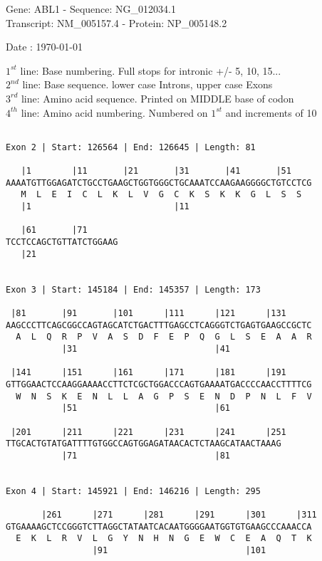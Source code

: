 \documentclass{article}
\begin{document}
\begin{center}
\begin{large}
Gene: ABL1 - Sequence: NG\_012034.1\\
Transcript: NM\_005157.4 - Protein: NP\_005148.2
 
 Date : \today
\end{large}
\end{center}
$1^{st}$ line: Base numbering. Full stops for intronic +/- 5, 10, 15...\\
$2^{nd}$ line: Base sequence. lower case Introns, upper case Exons\\
$3^{rd}$ line: Amino acid sequence. Printed on MIDDLE base of codon\\
$4^{th}$ line: Amino acid numbering. Numbered on $1^{st}$ and increments of 10\\
 \begin{Verbatim}
 
Exon 2 | Start: 126564 | End: 126645 | Length: 81
 
   |1        |11       |21       |31       |41       |51    
AAAATGTTGGAGATCTGCCTGAAGCTGGTGGGCTGCAAATCCAAGAAGGGGCTGTCCTCG
   M  L  E  I  C  L  K  L  V  G  C  K  S  K  K  G  L  S  S  
   |1                            |11                        
  
   |61       |71      
TCCTCCAGCTGTTATCTGGAAG
   |21                
  
 
Exon 3 | Start: 145184 | End: 145357 | Length: 173
 
 |81       |91       |101      |111      |121      |131     
AAGCCCTTCAGCGGCCAGTAGCATCTGACTTTGAGCCTCAGGGTCTGAGTGAAGCCGCTC
  A  L  Q  R  P  V  A  S  D  F  E  P  Q  G  L  S  E  A  A  R
           |31                           |41                
  
 |141      |151      |161      |171      |181      |191     
GTTGGAACTCCAAGGAAAACCTTCTCGCTGGACCCAGTGAAAATGACCCCAACCTTTTCG
  W  N  S  K  E  N  L  L  A  G  P  S  E  N  D  P  N  L  F  V
           |51                           |61                
  
 |201      |211      |221      |231      |241      |251
TTGCACTGTATGATTTTGTGGCCAGTGGAGATAACACTCTAAGCATAACTAAAG
           |71                           |81          
  
 
Exon 4 | Start: 145921 | End: 146216 | Length: 295
 
       |261      |271      |281      |291      |301      |311
GTGAAAAGCTCCGGGTCTTAGGCTATAATCACAATGGGGAATGGTGTGAAGCCCAAACCA
  E  K  L  R  V  L  G  Y  N  H  N  G  E  W  C  E  A  Q  T  K
                 |91                           |101         
  

\end{Verbatim}
\end{document}
